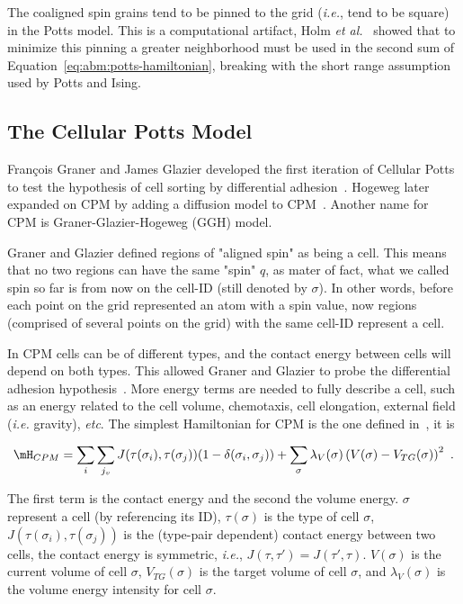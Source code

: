 The coaligned spin grains tend to be pinned to the grid (\textit{i.e.}, tend to be square) in the Potts model. This is a computational artifact, Holm \textit{et al.}~\cite{holm1991effects} showed that to minimize this pinning a greater neighborhood must be used in the second sum of Equation~\ref{eq:abm:potts-hamiltonian}, breaking with the short range assumption used by Potts and Ising.

\subsection{The Cellular Potts Model}\label{sec:abm:apm-history:cpm}

François Graner and James Glazier developed the first iteration of Cellular Potts to test the hypothesis of cell sorting by differential adhesion~\cite{graner1992simulation}. Hogeweg later expanded on CPM by adding a diffusion model to CPM~\cite{savill_modelling_1997}. Another name for CPM is Graner-Glazier-Hogeweg (GGH) model.

Graner and Glazier defined regions of "aligned spin" as being a cell. This means that no two regions can have the same "spin" $q$, as mater of fact, what we called spin so far is from now on the cell-ID (still denoted by $\sigma$). In other words, before each point on the grid represented an atom with a spin value, now regions (comprised of several points on the grid) with the same cell-ID represent a cell.

In CPM cells can be of different types, and the contact energy between cells will depend on both types. This allowed Graner and Glazier to probe the differential adhesion hypothesis~\cite{graner1992simulation}. More energy terms are needed to fully describe a cell, such as an energy related to the cell volume, chemotaxis, cell elongation, external field (\textit{i.e.} gravity), \textit{etc}. The simplest Hamiltonian for CPM is the one defined in~\cite{graner1992simulation}, it is

\begin{equation}\label{eq:abm:cpm-hamiltonian}
\mH_{CPM} = \sum_i \sum_{j_v} J(\tau(\sigma_i),\tau(\sigma_j))(1 - \delta(\sigma_i,\sigma_j)) + \sum_{\sigma}\lambda_V(\sigma)\left(V(\sigma) - V_{TG}(\sigma)\right)^2\,\,.
\end{equation}

\noindent The first term is the contact energy and the second the volume energy. $\sigma$ represent a cell (by referencing its ID), $\tau(\sigma)$ is the type of cell $\sigma$, $J(\tau(\sigma_i),\tau(\sigma_j))$ is the (type-pair dependent) contact energy between two cells, the contact energy is symmetric, \textit{i.e.}, $J(\tau,\tau') = J(\tau',\tau)$. $V(\sigma)$ is the current volume of cell $\sigma$, $V_{TG}(\sigma)$ is the target volume of cell $\sigma$, and $\lambda_V(\sigma)$ is the volume energy intensity for cell $\sigma$. 

